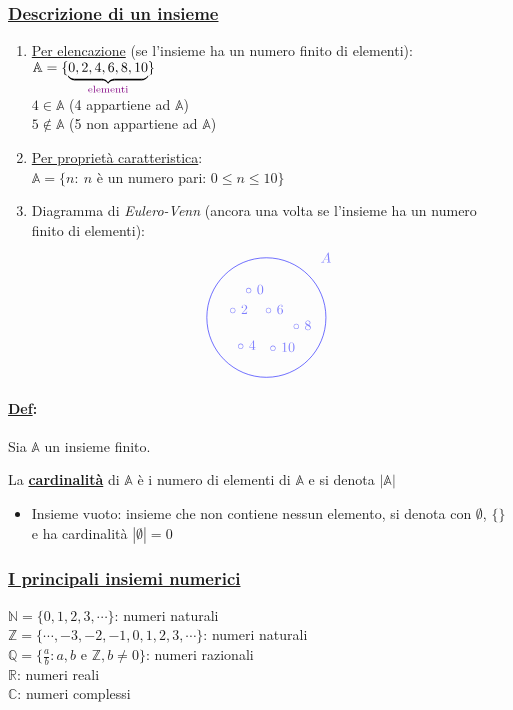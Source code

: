 \documentclass{article}
\newcommand{\ul}[1]{\underline{#1}}
\newcommand{\A}{\mathbb{A}}
\newcommand{\R}{\mathbb{R}}
\newcommand{\Def}[2]{\paragraph{\ul{Def}:}#1\\\hspace*{3em}\begin{minipage}{.8\textwidth}#2\end{minipage}}
\newcommand{\colort}[2]{\text{\color{#1}#2}}
\begin{document}
\subsubsection*{\color{green}\ul{Descrizione di un insieme}}
\begin{enumerate}
	\item \ul{Per elencazione} (se l'insieme ha un numero finito di elementi):\\
	      $\A=\{\underbrace{0,2,4,6,8,10}_{\colort{violet}{elementi}}\}$\\
	      $4\in\A$ (4 appartiene ad $\A$)\\
	      $5\notin\A$ (5 non appartiene ad $\A$)
	\item \ul{Per proprietà caratteristica}:\\
	      $\A=\{n:\ n$ è un numero pari: $0\le n\le 10\}$
	\item Diagramma di \textit{Eulero-Venn} (ancora una volta se l'insieme ha un numero finito di elementi):\\
	      \begin{displaymath}
		      \begin{tikzpicture}
			      \begin{scope}[shift={(3cm,-5cm)}, fill opacity=0.5]
				      \draw[blue] (0,0) circle (1.5cm);
				      \draw[blue] (1.5,1.5) node {$A$};
				      \draw[blue] (-0.3,0.7) node {$\circ\ 0$};
				      \draw[blue] (-0.7,0.2) node {$\circ\ 2$};
				      \draw[blue] (-0.5,-0.7) node {$\circ\ 4$};
				      \draw[blue] (0.4,-0.75) node {$\circ\ 10$};
				      \draw[blue] (0.9,-0.2) node {$\circ\ 8$};
				      \draw[blue] (0.2,0.2) node {$\circ\ 6$};
			      \end{scope}
		      \end{tikzpicture}
	      \end{displaymath}
\end{enumerate}
\Def{Sia $\A$ un insieme finito.}{La \ul{\textbf{cardinalità}} di $\A$ è i numero di elementi di $\A$ e si denota $|\A|$\\
	\begin{itemize}
		\item Insieme vuoto: insieme che non contiene nessun elemento, si denota con $\emptyset$, $\{\}$ e ha cardinalità $|\emptyset|=0$
	\end{itemize}}
\subsubsection*{\color{blue}\ul{I principali insiemi numerici}}
$\mathbb{N}=\{0,1,2,3,\cdots\}$: numeri naturali\\
$\mathbb{Z}=\{\cdots,-3,-2,-1,0,1,2,3,\cdots\}$: numeri naturali\\
$\mathbb{Q}=\{\frac{a}{b}:a,b$ e $\mathbb{Z},b\not=0\}$: numeri razionali\\
$\R$: numeri reali\\
$\mathbb{C}$: numeri complessi
\end{document}
